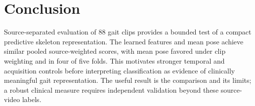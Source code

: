 \documentclass[10pt,twocolumn,letterpaper]{article}
\begin{document}
\section{Conclusion}
Source-separated evaluation of 88 gait clips provides a bounded test of a compact predictive skeleton representation. The learned features and mean pose achieve similar pooled source-weighted scores, with mean pose favored under clip weighting and in four of five folds. This motivates stronger temporal and acquisition controls before interpreting classification as evidence of clinically meaningful gait representation. The useful result is the comparison and its limits; a robust clinical measure requires independent validation beyond these source-video labels.

{\small


}
\end{document}
